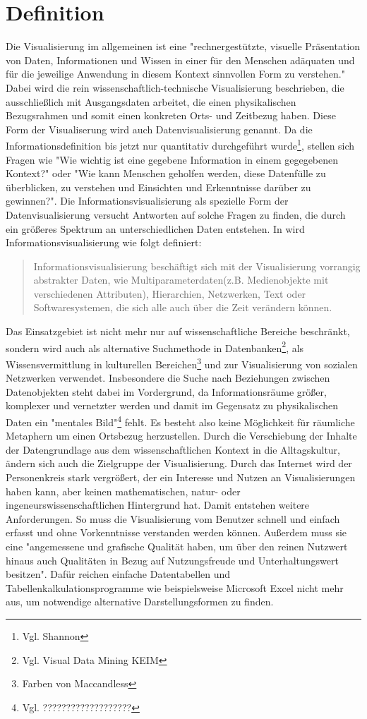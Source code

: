 \documentclass[a4paper, 12pt, DIVcalc, onepage, pdftex, headsepline, footsepline]{scrreprt}
\begin{document}
\section{Definition}
\label{sec:Definition}
Die Visualisierung im allgemeinen ist eine "rechnergestützte, visuelle Präsentation von Daten, Informationen und Wissen
in einer für den Menschen adäquaten und für die jeweilige Anwendung in diesem Kontext sinnvollen Form
zu verstehen."\citep[S.\,3]{Schumann}
Dabei wird die rein wissenschaftlich-technische Visualisierung beschrieben, die ausschließlich mit Ausgangsdaten arbeitet,
die einen physikalischen Bezugsrahmen und somit einen konkreten Orts- und Zeitbezug haben. Diese Form der
Visualiserung wird auch Datenvisualisierung genannt.
Da die Informationsdefinition bis jetzt nur quantitativ durchgeführt wurde\footnote{Vgl. Shannon}, stellen sich 
Fragen wie "Wie wichtig ist eine gegebene Information in einem gegegebenen Kontext?"\citep[S.\,341]{Schumann}
oder "Wie kann Menschen geholfen werden, diese Datenfülle zu überblicken, zu verstehen und Einsichten und Erkenntnisse
darüber zu gewinnen?"\citep[S.\,435]{Preim}.
Die Informationsvisualisierung als spezielle Form der Datenvisualisierung versucht Antworten auf solche
Fragen zu finden, die durch ein größeres Spektrum an unterschiedlichen Daten entstehen.
In \citep[S.\,434]{Preim} wird Informationsvisualisierung wie folgt definiert:
\begin{quote}
Informationsvisualisierung beschäftigt sich mit der Visualisierung vorrangig abstrakter Daten, wie
Multiparameterdaten(z.B. Medienobjekte mit verschiedenen Attributen), Hierarchien, Netzwerken, Text
oder Softwaresystemen, die sich alle auch über die Zeit verändern können.
\end{quote}
Das Einsatzgebiet ist nicht mehr nur auf wissenschaftliche Bereiche beschränkt,
sondern wird auch als alternative Suchmethode in Datenbanken\footnote{Vgl. Visual Data Mining KEIM},
als Wissensvermittlung in kulturellen Bereichen\footnote{Farben von Maccandless} und zur Visualisierung von
sozialen Netzwerken verwendet.
Insbesondere die Suche nach Beziehungen zwischen Datenobjekten steht dabei im Vordergrund,
da Informationsräume größer, komplexer und vernetzter werden und damit im Gegensatz
zu physikalischen Daten ein "mentales Bild"\footnote{Vgl. ???????????????????} fehlt.
Es besteht also keine Möglichkeit für räumliche Metaphern um einen Ortsbezug herzustellen.
Durch die Verschiebung der Inhalte der Datengrundlage aus dem wissenschaftlichen Kontext
in die Alltagskultur, ändern sich auch die Zielgruppe der Visualisierung. Durch das Internet
wird der Personenkreis stark vergrößert, der ein Interesse und Nutzen an Visualisierungen
haben kann, aber keinen mathematischen, natur- oder ingeneurswissenschaftlichen Hintergrund
hat. Damit entstehen weitere Anforderungen. So muss die Visualisierung vom Benutzer
schnell und einfach erfasst und ohne Vorkenntnisse verstanden werden können.
Außerdem muss sie eine "angemessene und grafische Qualität haben, um über den
reinen Nutzwert hinaus auch Qualitäten in Bezug auf Nutzungsfreude und Unterhaltungswert besitzen".\citep[S.\,438]{Preim}
Dafür reichen einfache Datentabellen und Tabellenkalkulationsprogramme wie beispielsweise Microsoft Excel
nicht mehr aus, um notwendige alternative Darstellungsformen zu finden.
\end{document}
